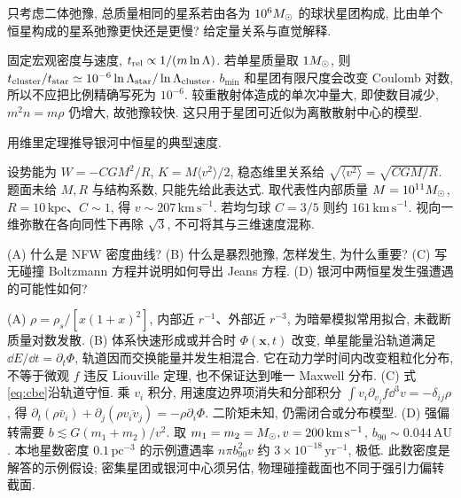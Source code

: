 \begin{exercise}
只考虑二体弛豫, 总质量相同的星系若由各为 $10^6M_{\odot}$ 的球状星团构成, 比由单个恒星构成的星系弛豫更快还是更慢? 给定量关系与直觉解释.
\end{exercise}
\begin{solution}
固定宏观密度与速度, $t_{\rm rel}\propto1/(m\ln\Lambda)$. 若单星质量取 $1M_{\odot}$, 则 $t_{\rm cluster}/t_{\rm star}\simeq10^{-6}\ln\Lambda_{\rm star}/\ln\Lambda_{\rm cluster}$. $b_{\min}$ 和星团有限尺度会改变 Coulomb 对数, 所以不应把比例精确写死为 $10^{-6}$. 较重散射体造成的单次冲量大, 即使数目减少, $m^2n=m\rho$ 仍增大, 故弛豫较快. 这只用于星团可近似为离散散射中心的模型.
\end{solution}

\begin{exercise}
用维里定理推导银河中恒星的典型速度.
\end{exercise}
\begin{solution}
设势能为 $W=-C GM^2/R$, $K=M\langle v^2\rangle/2$, 稳态维里关系给 $\sqrt{\langle v^2\rangle}=\sqrt{CGM/R}$. 题面未给 $M,R$ 与结构系数, 只能先给此表达式. 取代表性内部质量 $M=10^{11}M_{\odot}$, $R=10\,\mathrm{kpc}$、$C\sim1$, 得 $v\sim207\,\mathrm{km\,s^{-1}}$. 若均匀球 $C=3/5$ 则约 $161\,\mathrm{km\,s^{-1}}$. 视向一维弥散在各向同性下再除 $\sqrt3$, 不可将其与三维速度混称.
\end{solution}

\begin{exercise}
(A) 什么是 NFW 密度曲线?
(B) 什么是暴烈弛豫, 怎样发生, 为什么重要?
(C) 写无碰撞 Boltzmann 方程并说明如何导出 Jeans 方程.
(D) 银河中两恒星发生强遭遇的可能性如何?
\end{exercise}
\begin{solution}
(A) $\rho=\rho_s/[x(1+x)^2]$, 内部近 $r^{-1}$、外部近 $r^{-3}$, 为暗晕模拟常用拟合, 未截断质量对数发散.
(B) 体系快速形成或并合时 $\Phi(\boldsymbol x,t)$ 改变, 单星能量沿轨道满足 $\dd E/\dd t=\partial_t\Phi$, 轨道因而交换能量并发生相混合. 它在动力学时间内改变粗粒化分布, 不等于微观 $f$ 违反 Liouville 定理, 也不保证达到唯一 Maxwell 分布.
(C) 式\eqref{eq:cbe}沿轨道守恒. 乘 $v_i$ 积分, 用速度边界项消失和分部积分 $\int v_i\partial_{v_j}f\dd^3v=-\delta_{ij}\rho$, 得 $\partial_t(\rho\bar v_i)+\partial_j(\rho\overline{v_iv_j})=-\rho\partial_i\Phi$. 二阶矩未知, 仍需闭合或分布模型.
(D) 强偏转需要 $b\lesssim G(m_1+m_2)/v^2$. 取 $m_1=m_2=M_{\odot},v=200\,\mathrm{km\,s^{-1}}$, $b_{90}\sim0.044\,\mathrm{AU}$. 本地星数密度 $0.1\,\mathrm{pc^{-3}}$ 的示例遭遇率 $n\pi b_{90}^2v$ 约 $3\times10^{-18}\,\mathrm{yr^{-1}}$, 极低. 此数密度是解答的示例假设; 密集星团或银河中心须另估, 物理碰撞截面也不同于强引力偏转截面.
\end{solution}
